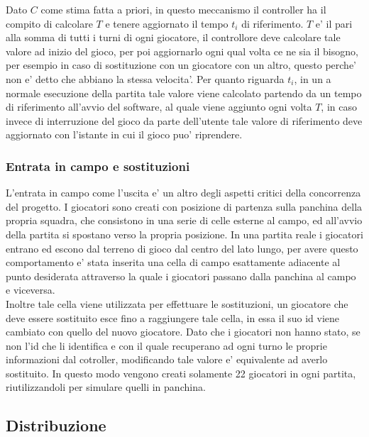 Dato $C$ come stima fatta a priori, in questo meccanismo il controller ha il compito di calcolare $T$ e tenere aggiornato il tempo $t_i$ di riferimento. $T$ e' il pari alla somma di tutti i turni di ogni giocatore, il controllore deve calcolare tale valore ad inizio del gioco, per poi aggiornarlo ogni qual volta ce ne sia il bisogno, per esempio in caso di sostituzione con un giocatore con un altro, questo perche' non e' detto che abbiano la stessa velocita'. Per quanto riguarda $t_i$, in un
a normale esecuzione della partita tale valore viene calcolato partendo da un tempo di riferimento all'avvio del software, al quale viene aggiunto ogni volta $T$, in caso invece di interruzione del gioco da parte dell'utente tale valore di riferimento deve aggiornato con l'istante in cui il gioco puo' riprendere.

\subsubsection{Entrata in campo e sostituzioni}
\label{sec:analisi_concorrenza_uscita_campo}

L'entrata in campo come l'uscita e' un altro degli aspetti critici della concorrenza del progetto. I giocatori sono creati con posizione di partenza sulla panchina della propria squadra, che consistono in una serie di celle esterne al campo, ed all'avvio della partita si spostano verso la propria posizione. In una partita reale i giocatori entrano ed escono dal terreno di gioco dal centro del lato lungo, per avere questo comportamento e' stata inserita una cella di campo esattamente adiacente al punto desiderata attraverso la quale i giocatori passano dalla panchina al campo e viceversa.\\

Inoltre tale cella viene utilizzata per effettuare le sostituzioni, un giocatore che deve essere sostituito esce fino a raggiungere tale cella, in essa il suo id viene cambiato con quello del nuovo giocatore. Dato che i giocatori non hanno stato, se non l'id che li identifica e con il quale recuperano ad ogni turno le proprie informazioni dal cotroller, modificando tale valore e' equivalente ad averlo sostituito. In questo modo vengono creati solamente 22 giocatori in ogni partita, riutilizzandoli per simulare quelli in panchina.

\subsection{Distribuzione}
\label{sec:analisi_distribuzione}

